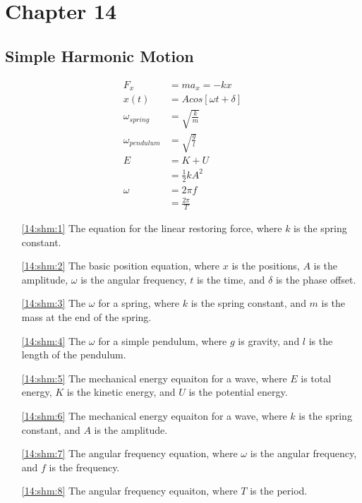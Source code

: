 \documentclass{subfiles}
\begin{document}
\section{Chapter 14}
\subsection{Simple Harmonic Motion}

\begin{align}
	F_{x} &= ma_{x} = -kx \label{14:shm:1}\\
	x \left( t \right) &= A cos \left[ \omega t + \delta \right] \label{14:shm:2}\\
	\omega_{spring} &= \sqrt{\frac{k}{m}} \label{14:shm:3}\\
	\omega_{pendulum} &= \sqrt{\frac{g}{l}} \label{14:shm:4}\\
	E &= K + U \label{14:shm:5}\\ 
	&= \frac{1}{2}kA^{2} \label{14:shm:6}\\
	\omega &= 2\pi f \label{14:shm:7}\\
	&= \frac{2\pi }{T} \label{14:shm:8}
\end{align}

\begin{enumerate}
	\item[\eqref{14:shm:1}] The equation for the linear restoring force, where $k$ is the spring constant.
	\item[\eqref{14:shm:2}] The basic position equation, where $x$ is the positions, $A$ is the amplitude, $\omega$ is the angular frequency, $t$ is the time, and $\delta$ is the phase offset.
	\item[\eqref{14:shm:3}] The $\omega$ for a spring, where $k$ is the spring constant, and $m$ is the mass at the end of the spring.
	\item[\eqref{14:shm:4}] The $\omega$ for a simple pendulum, where $g$ is gravity, and $l$ is the length of the pendulum.
	\item[\eqref{14:shm:5}] The mechanical energy equaiton for a wave, where $E$ is total energy, $K$ is the kinetic energy, and $U$ is the potential energy.
	\item[\eqref{14:shm:6}] The mechanical energy equaiton for a wave, where $k$ is the spring constant, and $A$ is the amplitude.
	\item[\eqref{14:shm:7}] The angular frequency equation, where $\omega$ is the angular frequency, and $f$ is the frequency.
	\item[\eqref{14:shm:8}] The angular frequency equaiton, where $T$ is the period.
\end{enumerate}
\end{document}
